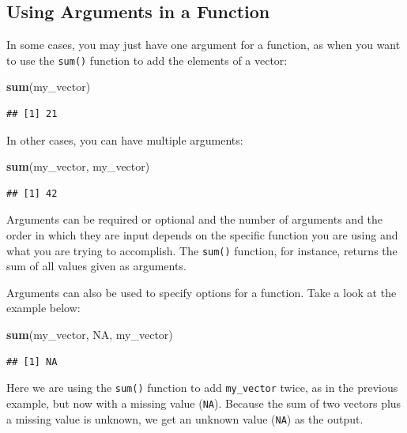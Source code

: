 \documentclass[
]{book}
\newenvironment{Shaded}{\begin{snugshade}}{\end{snugshade}}
\newcommand{\ConstantTok}[1]{\textcolor[rgb]{0.56,0.35,0.01}{#1}}
\newcommand{\FunctionTok}[1]{\textcolor[rgb]{0.13,0.29,0.53}{\textbf{#1}}}
\newcommand{\NormalTok}[1]{#1}
\begin{document}
\hypertarget{using-arguments-in-a-function}{%
\subsection{Using Arguments in a Function}\label{using-arguments-in-a-function}}

In some cases, you may just have one argument for a function, as when you want to use the \texttt{sum()} function to add the elements of a vector:

\begin{Shaded}
\begin{Highlighting}[]
\FunctionTok{sum}\NormalTok{(my\_vector)}
\end{Highlighting}
\end{Shaded}

\begin{verbatim}
## [1] 21
\end{verbatim}

In other cases, you can have multiple arguments:

\begin{Shaded}
\begin{Highlighting}[]
\FunctionTok{sum}\NormalTok{(my\_vector, my\_vector)}
\end{Highlighting}
\end{Shaded}

\begin{verbatim}
## [1] 42
\end{verbatim}

Arguments can be required or optional and the number of arguments and the order in which they are input depends on the specific function you are using and what you are trying to accomplish. The \texttt{sum()} function, for instance, returns the sum of all values given as arguments.

Arguments can also be used to specify options for a function. Take a look at the example below:

\begin{Shaded}
\begin{Highlighting}[]
\FunctionTok{sum}\NormalTok{(my\_vector, }\ConstantTok{NA}\NormalTok{, my\_vector)}
\end{Highlighting}
\end{Shaded}

\begin{verbatim}
## [1] NA
\end{verbatim}

Here we are using the \texttt{sum()} function to add \texttt{my\_vector} twice, as in the previous example, but now with a missing value (\texttt{NA}). Because the sum of two vectors plus a missing value is unknown, we get an unknown value (\texttt{NA}) as the output.
\end{document}
